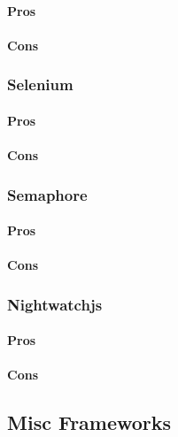 \documentclass[11pt]{article}
\begin{document}
\paragraph{Pros}

\paragraph{Cons}

\subsubsection{Selenium}

\paragraph{Pros}

\paragraph{Cons}

\subsubsection{Semaphore}

\paragraph{Pros}

\paragraph{Cons}

\subsubsection{Nightwatchjs}

\paragraph{Pros}

\paragraph{Cons}

\subsection{Misc Frameworks}
\end{document}
